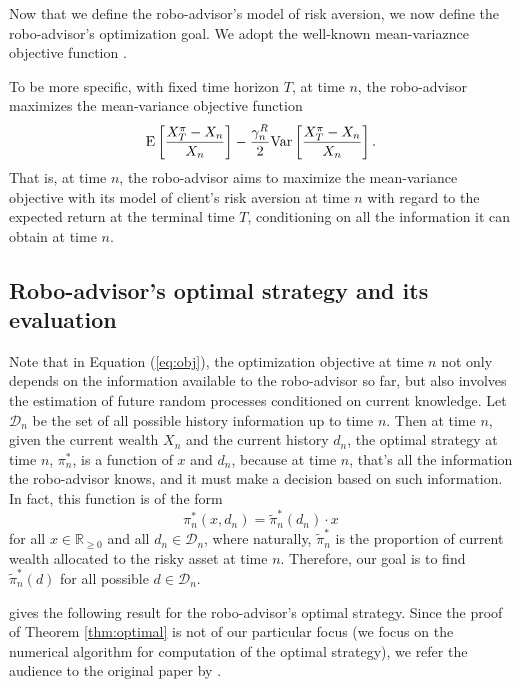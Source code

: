 Now that we define the robo-advisor's model of risk aversion, we now define the robo-advisor's optimization goal. We adopt the well-known mean-variaznce objective function \cite{markowitz1952portfolio}.

To be more specific, with fixed time horizon $T$, at time $n$, the robo-advisor maximizes the mean-variance objective function \begin{equation}\label{eq:obj}
\mathrm{E}\left[\frac{X_T^\pi-X_n}{X_n}\right]-\frac{\gamma_n^R}2\mathrm{Var}\left[\frac{X_T^\pi-X_n}{X_n}\right].
\end{equation}
That is, at time $n$, the robo-advisor aims to maximize the mean-variance objective with its model of client's risk aversion at time $n$ with regard to the expected return at the terminal time $T$, conditioning on all the information it can obtain at time $n$. 

\subsection{Robo-advisor's optimal strategy and its evaluation}

Note that in Equation (\ref{eq:obj}), the optimization objective at time $n$ not only depends on the information available to the robo-advisor so far, but also involves the estimation of future random processes conditioned on current knowledge. Let $\mathcal{D}_n$ be the set of all possible history information up to time $n$. Then at time $n$, given the current wealth $X_n$ and the current history $d_n$, the optimal strategy at time $n$, $\pi_n^*$, is a function of $x$ and $d_n$, because at time $n$, that's all the information the robo-advisor knows, and it must make a decision based on such information. In fact, this function is of the form \begin{equation}
    \pi^*_n(x,d_n)=\tilde\pi_n^*(d_n)\cdot x
\end{equation} for all $x\in \mathbb{R}_{\geq0}$ and all $d_n\in\mathcal D_n$, where naturally, $\tilde\pi_n^*$ is the proportion of current wealth allocated to the risky asset at time $n$. Therefore, our goal is to find $\tilde\pi_n^*(d)$ for all possible $d\in\mathcal{D}_n$.

 gives the following result for the robo-advisor's optimal strategy. Since the proof of Theorem \ref{thm:optimal} is not of our particular focus (we focus on the numerical algorithm for computation of the optimal strategy), we refer the audience to the original paper by .

